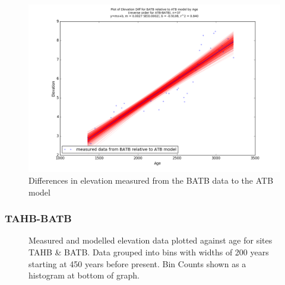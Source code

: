 \begin{figure}[H]
	\includegraphics[width=0.9\linewidth]{data/bothNonZero/withinSeventyFivePercent/gias/theGIA_BATB_relative_to_ATB.png}
	\caption{Differences in elevation measured from the BATB data to the ATB model}
	\label{fig:gias_BATBxATB}
\end{figure}
\newpage













\subsubsection{TAHB-BATB}

\begin{figure}[H]
	\caption{Measured and modelled elevation data plotted against age for sites TAHB \& BATB. Data grouped into bins with widths of 200 years starting at 450 years before present. Bin Counts shown as a histogram at bottom of graph.}	
	\label{fig:data_TAHBxBATB}
\end{figure}

